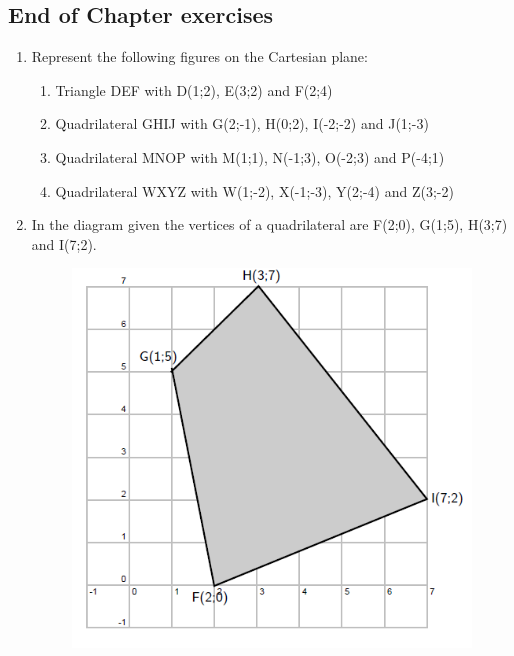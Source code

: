 \par 
\label{m39167*secfhsst!!!underscore!!!id2370}
            \subsection{ End of Chapter exercises}
            \nopagebreak
            
        \label{m39167*id69671}\begin{enumerate}[noitemsep, label=\textbf{\arabic*}. ] 
            \label{m39167*uid43466}\item 
Represent the following figures on the Cartesian plane: \label{m39167*id6549695}\begin{enumerate}[noitemsep, label=\textbf{\alph*}. ] 
            \label{m39167*uid4746}\item 
Triangle DEF with D(1;2), E(3;2) and F(2;4) 
\label{m39167*uid4548}\item Quadrilateral GHIJ with G(2;-1), H(0;2), I(-2;-2) and J(1;-3)
\label{m39167*uid4549}\item  Quadrilateral MNOP with M(1;1), N(-1;3), O(-2;3) and P(-4;1) 
\label{m39167*uid5450}\item  Quadrilateral WXYZ with W(1;-2), X(-1;-3), Y(2;-4) and Z(3;-2)
\end{enumerate}
                \label{m39167*uid46}\item 
In the diagram given the vertices of a quadrilateral are F(2;0), G(1;5), H(3;7) and I(7;2).

    \setcounter{subfigure}{0}


	\begin{figure}[H] %
    \begin{center}
    \label{m39167*id69688!!!underscore!!!media}\label{m39167*id69688!!!underscore!!!printimage}\includegraphics{col11306.imgs/m39167_MG10C14_021.png} %
        

\end{center}
\end{figure}
\end{enumerate}
